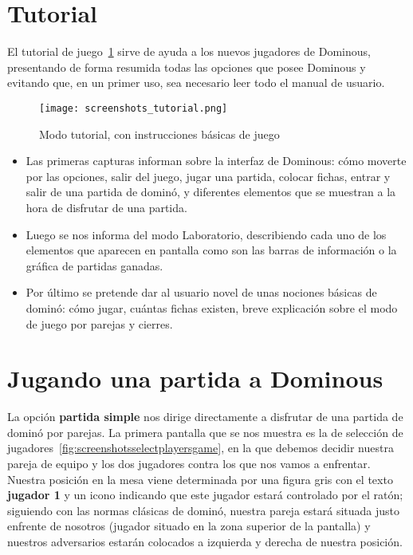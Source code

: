 \section{Tutorial}

El tutorial de juego~\ref{fig:screenshotstutorial} sirve de ayuda a los nuevos jugadores de Dominous, presentando de forma
resumida todas las opciones que posee Dominous y evitando que, en un primer uso, sea necesario leer todo el manual de usuario.

\begin{figure}[h]
  \begin{center}
    \texttt{[image: screenshots\_tutorial.png]}
  \end{center}
  \caption{Modo tutorial, con instrucciones básicas de juego}
  \label{fig:screenshotstutorial}
\end{figure}

\begin{itemize}
    \item Las primeras capturas informan sobre la interfaz de Dominous: cómo moverte por las opciones, salir del juego, jugar
        una partida, colocar fichas, entrar y salir de una partida de dominó, y diferentes elementos que se muestran a la
        hora de disfrutar de una partida.
    \item Luego se nos informa del modo Laboratorio, describiendo cada uno de los elementos que aparecen en pantalla como
        son las barras de información o la gráfica de partidas ganadas.
    \item Por último se pretende dar al usuario novel de unas nociones básicas de dominó: cómo jugar, cuántas fichas existen,
        breve explicación sobre el modo de juego por parejas y cierres.
\end{itemize}


\section{Jugando una partida a Dominous}

La opción \textbf{partida simple} nos dirige directamente a disfrutar de una partida de dominó por parejas. La primera
pantalla que se nos muestra es la de selección de jugadores~\ref{fig:screenshotsselectplayersgame}, en la que debemos
decidir nuestra pareja de equipo y los dos jugadores contra los que nos vamos a enfrentar. \\

Nuestra posición en la mesa viene determinada por una figura gris con el texto \textbf{jugador 1} y un icono indicando
que este jugador estará controlado por el ratón; siguiendo con las normas clásicas de dominó, nuestra pareja estará situada
justo enfrente de nosotros (jugador situado en la zona superior de la pantalla) y nuestros adversarios estarán colocados
a izquierda y derecha de nuestra posición. \\

